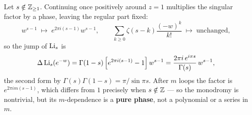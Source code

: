 \begin{corollary}[Monodromy of $\Li_s$ Around $z = 1$]\label{cor:Li-monodromy}
Let $s \notin \mathbb{Z}_{\geq 1}$. Continuing once positively around $z = 1$ multiplies
the singular factor by a phase, leaving the regular part fixed:
\begin{equation}
w^{s-1} \;\longmapsto\; e^{2\pi i (s-1)} w^{s-1},
\qquad
\sum_{k \geq 0} \zeta(s-k)\frac{(-w)^k}{k!} \;\longmapsto\; \text{unchanged},
\end{equation}
so the jump of $\Li_s$ is
\begin{equation}
\Delta \operatorname{Li}_s(e^{-w}) = \Gamma(1-s)\left[e^{2\pi i (s-1)} - 1\right] w^{s-1}
= \frac{2\pi i\, e^{i\pi s}}{\Gamma(s)}\, w^{s-1},
\label{eq:Li-monodromy-corrected}
\end{equation}
the second form by $\Gamma(s)\Gamma(1-s) = \pi/\sin \pi s$. After $m$ loops the
factor is $e^{2\pi i m (s-1)}$, which differs from $1$ precisely when
$s \notin \mathbb{Z}$ --- so the monodromy is nontrivial, but its $m$-dependence is a
\textbf{pure phase}, not a polynomial or a series in $m$.
\end{corollary}

